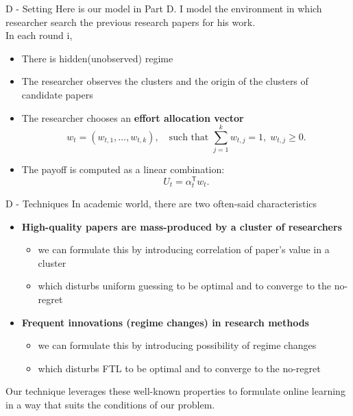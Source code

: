 \documentclass{beamer}
\begin{document}
\begin{frame}{D - Setting}
    Here is our model in Part D. I model the environment in which researcher search the previous research papers for his work.\\
    In each round i, 
    \begin{itemize}
        \item There is hidden(unobserved) regime 
        \item The researcher observes the clusters and the origin of the clusters of candidate papers 
        \item The researcher chooses an \textbf{effort allocation vector}
              \[
              w_t = (w_{t,1}, \ldots, w_{t,k}), 
              \quad \text{such that } \sum_{j=1}^{k} w_{t,j} = 1,\; w_{t,j} \ge 0.
              \]
        \item The payoff is computed as a linear combination:
              \[
              U_t = \alpha_t^{\mathsf{T}} w_t.
              \]
    \end{itemize}
\end{frame}

\begin{frame}{D - Techniques}
    In academic world, there are two often-said characteristics
    \begin{itemize}
        \item \textbf{High-quality papers are mass-produced by a cluster of researchers}
        \begin{itemize}
            \item we can formulate this by introducing correlation of paper's value in a cluster
            \item which disturbs uniform guessing to be optimal and to converge to the no-regret
        \end{itemize}
        \item \textbf{Frequent innovations (regime changes) in research methods}
        \begin{itemize}
            \item we can formulate this by introducing possibility of regime changes 
            \item which disturbs FTL to be optimal and to converge to the no-regret
        \end{itemize}
    \end{itemize}
    Our technique leverages these well-known properties to formulate online learning in a way that suits the conditions of our problem.
\end{frame}
\end{document}
